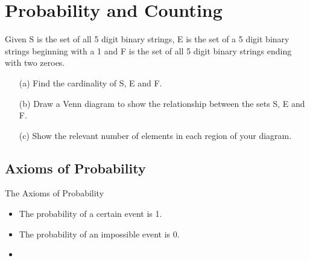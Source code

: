 \documentclass[]{report}
\begin{document}
\section{Probability and Counting}

Given S is the set of all 5 digit binary strings, E is the set of a 5 digit
binary strings beginning with a 1 and F is the set of all 5 digit binary strings ending
with two zeroes.
\begin{itemize}
\item[(a)] Find the cardinality of S, E and F.
\item[(b)] Draw a Venn diagram to show the relationship between the sets S, E and F.
\item[(c)]Show the relevant number of elements in each region of your diagram.
\end{itemize}
\newpage




\subsection{Axioms of Probability}

The Axioms of Probability

\begin{itemize}
\item The probability of a certain event is 1.
\item The probability of an impossible event is 0.
\item 
\end{itemize}
\end{document}
